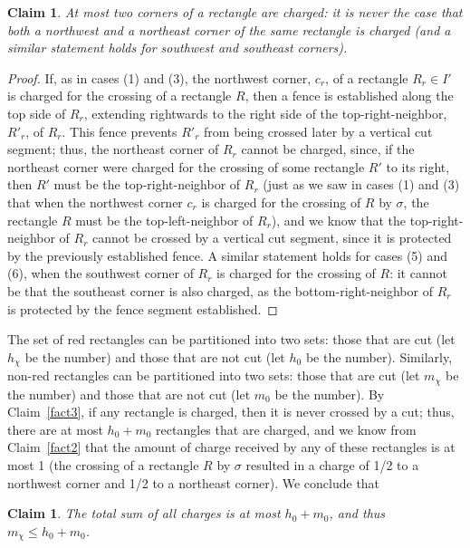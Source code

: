 \documentclass{article}
\newtheorem{claim}[theorem]{Claim}
\begin{document}
\begin{claim}
  \label{fact5}
  At most two corners of a rectangle are charged: it is never the case
  that both a northwest and a northeast corner of the same rectangle
  is charged (and a similar statement holds for southwest and southeast
  corners).
\end{claim}

\begin{proof}
  If, as in cases (1) and (3), the northwest corner, $c_r$, of a rectangle
  $R_r\in I'$ is charged for the crossing of a rectangle $R$, then a fence is established along the top side of $R_r$,
  extending rightwards to the right side of the top-right-neighbor, $R'_r$, of
  $R_r$. This fence prevents $R'_r$ from being
  crossed later by a vertical cut segment; thus, the northeast corner of
  $R_r$ cannot be charged, since, if the
  northeast corner were charged for the crossing of some rectangle
  $R'$ to its right, then $R'$ must be the top-right-neighbor of $R_r$ (just as we saw in cases (1) and (3) that when the northwest corner $c_r$ is charged for the crossing of $R$ by $\sigma$, the rectangle $R$ must be the top-left-neighbor of $R_r$), and we know
  that the top-right-neighbor of $R_r$ cannot be crossed by a vertical cut segment, since it
  is protected by the previously established fence.  A similar statement holds for cases (5) and (6), when the southwest corner of $R_r$ is charged for the crossing of $R$: it cannot be that the southeast corner is also charged, as the bottom-right-neighbor of $R_r$ is protected by the fence segment established.
\end{proof}

The set of red rectangles can be partitioned into two sets: those that
are cut (let $h_\chi$ be the number) and those that are not cut (let
$h_0$ be the number).
%
Similarly, non-red rectangles can be partitioned into two sets: those that are
cut (let $m_\chi$ be the number) and those that are not cut (let $m_0$
be the number).
%
By Claim~\ref{fact3}, if any rectangle is charged,
then it is never crossed by a cut; thus, there are at most $h_0+m_0$
rectangles that are charged, and we know from
Claim~\ref{fact2} that the amount of charge received by any of these
rectangles is at most 1 (the crossing of a rectangle $R$ by $\sigma$ resulted in a charge of 1/2 to a northwest corner and 1/2 to a northeast corner).
%
We conclude that

\begin{claim}
  \label{fact6}
  The total sum of all charges is at most $h_0+m_0$, and thus $m_\chi\leq h_0+m_0$. 
\end{claim}
\end{document}
